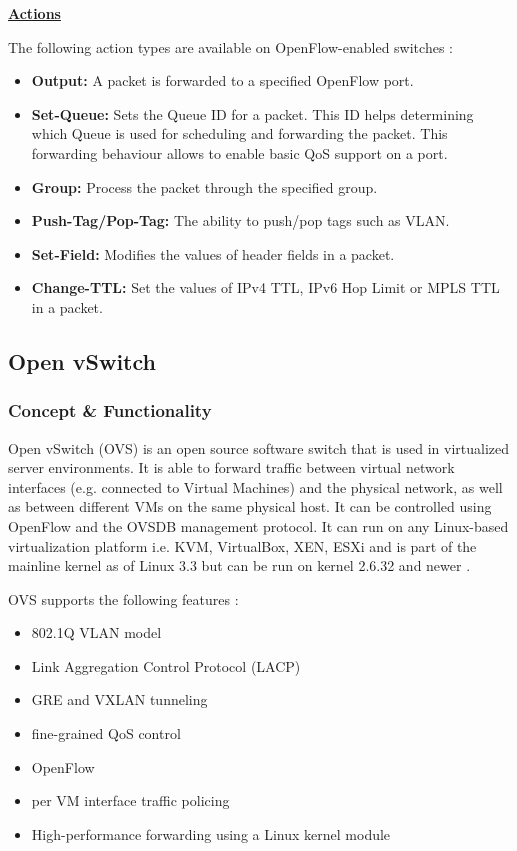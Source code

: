 \underline{\textbf{Actions}}

The following action types are available on OpenFlow-enabled switches \cite{ofspecification}:
\begin{itemize}
\item \textbf{Output:} A packet is forwarded to a specified OpenFlow port.
\item \textbf{Set-Queue:} Sets the Queue ID for a packet. This ID helps determining which Queue is used for scheduling and forwarding the packet. This forwarding behaviour allows to enable basic QoS support on a port.
\item \textbf{Group:} Process the packet through the specified group.
\item \textbf{Push-Tag/Pop-Tag:} The ability to push/pop tags such as VLAN.
\item \textbf{Set-Field:} Modifies the values of header fields in a packet.
\item \textbf{Change-TTL:} Set the values of IPv4 TTL, IPv6 Hop Limit or MPLS TTL in a packet.
\end{itemize} 

\subsection{Open vSwitch}

\subsubsection{Concept \& Functionality}

Open vSwitch (OVS) is an open source software switch that is used in virtualized server environments. It is able to forward traffic between virtual network interfaces (e.g. connected to Virtual Machines) and the physical network, as well as between different VMs on the same physical host. It can be controlled using OpenFlow and the OVSDB management protocol. It can run on any Linux-based virtualization platform i.e. KVM, VirtualBox, XEN, ESXi and is part of the mainline kernel as of Linux 3.3 but can be run on kernel 2.6.32 and newer \cite{ovs-faq}.

OVS supports the following features \cite{ovs-readme}:
\begin{itemize}
\item 802.1Q VLAN model
\item Link Aggregation Control Protocol (LACP)
\item GRE and VXLAN tunneling
\item fine-grained QoS control
\item OpenFlow
\item per VM interface traffic policing
\item High-performance forwarding using a Linux kernel module
\end{itemize}

